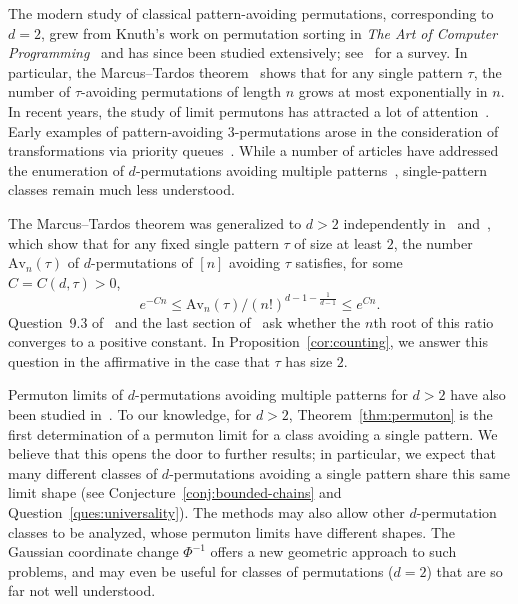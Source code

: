 \documentclass[11pt,letterpaper]{article}
\begin{document}
The modern study of classical pattern-avoiding permutations, corresponding to $d=2$, grew from Knuth's work on permutation sorting in {\em The Art of Computer Programming}~\cite{Knuth} and has since been studied extensively; see~\cite{Vatter} for a survey. In particular, the Marcus--Tardos theorem~\cite{marcus2004excluded} shows that for any single pattern $\tau$, the number of $\tau$-avoiding permutations of length $n$ grows at most exponentially in $n$. In recent years, the study of limit permutons has attracted a lot of attention~\cite{borga2020local,garbe2024pattern,hohmeier2025permuton,bassino2018brownian}. Early examples of pattern-avoiding $3$-permutations arose in the consideration of transformations via priority queues~\cite{atkinson1995priority}. While a number of articles have addressed the enumeration of $d$-permutations avoiding multiple patterns~\cite{aldred2005permuting,EP2026stretched,BM}, single-pattern classes remain much less understood.

The Marcus--Tardos theorem was generalized to $d>2$ independently in~\cite[Theorem~1.9]{CK} and~\cite[Theorem~3.4]{GP}, which show that for any fixed single pattern $\tau$ of size at least $2$, the number $\text{Av}_{n}(\tau)$ of $d$-permutations of $[n]$ avoiding $\tau$ satisfies, for some $C=C(d,\tau)>0$,
\[
      e^{-C n}\le\text{Av}_{n}(\tau)\Big/(n!)^{d-1-\frac1{d-1}}\le e^{C n}.
\]
Question~9.3 of~\cite{CK} and the last section of~\cite{GP} ask whether the $n$th root of this ratio converges to a positive constant. In Proposition~\ref{cor:counting}, we answer this question in the affirmative in the case that $\tau$ has size $2$.

Permuton limits of $d$-permutations avoiding multiple patterns for $d>2$ have also been studied in~\cite{BL}. To our knowledge, for $d>2$, Theorem~\ref{thm:permuton} is the first determination of a permuton limit for a class avoiding a single pattern. We believe that this opens the door to further results; in particular, we expect that many different classes of $d$-permutations avoiding a single pattern share this same limit shape (see Conjecture~\ref{conj:bounded-chains} and Question~\ref{ques:universality}). The methods may also allow other $d$-permutation classes to be analyzed, whose permuton limits have different shapes. The Gaussian coordinate change $\Phi^{-1}$ offers a new geometric approach to such problems, and may even be useful for classes of permutations ($d=2$) that are so far not well understood.
\end{document}
